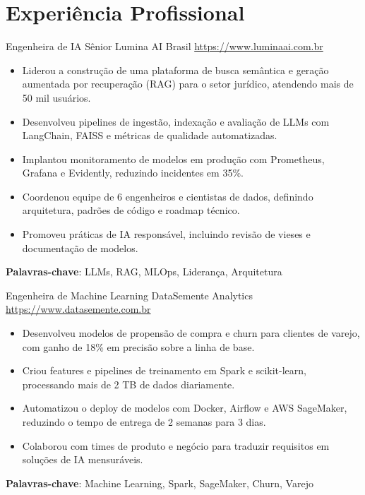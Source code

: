 \documentclass[a4paper, serif, 10pt]{moderncv}
\begin{document}
\section{Experiência Profissional}

        {Engenheira de IA Sênior}
        {Lumina AI Brasil}
        {\url{https://www.luminaai.com.br}}
        {}
        {\begin{itemize}
\item Liderou a construção de uma plataforma de busca semântica e geração aumentada por recuperação (RAG) para o setor jurídico, atendendo mais de 50 mil usuários.
\item Desenvolveu pipelines de ingestão, indexação e avaliação de LLMs com LangChain, FAISS e métricas de qualidade automatizadas.
\item Implantou monitoramento de modelos em produção com Prometheus, Grafana e Evidently, reduzindo incidentes em 35\%.
\item Coordenou equipe de 6 engenheiros e cientistas de dados, definindo arquitetura, padrões de código e roadmap técnico.
\item Promoveu práticas de IA responsável, incluindo revisão de vieses e documentação de modelos.
\end{itemize}
\textbf{Palavras-chave}: LLMs, RAG, MLOps, Liderança, Arquitetura}

        {Engenheira de Machine Learning}
        {DataSemente Analytics}
        {\url{https://www.datasemente.com.br}}
        {}
        {\begin{itemize}
\item Desenvolveu modelos de propensão de compra e churn para clientes de varejo, com ganho de 18\% em precisão sobre a linha de base.
\item Criou features e pipelines de treinamento em Spark e scikit-learn, processando mais de 2 TB de dados diariamente.
\item Automatizou o deploy de modelos com Docker, Airflow e AWS SageMaker, reduzindo o tempo de entrega de 2 semanas para 3 dias.
\item Colaborou com times de produto e negócio para traduzir requisitos em soluções de IA mensuráveis.
\end{itemize}
\textbf{Palavras-chave}: Machine Learning, Spark, SageMaker, Churn, Varejo}
\end{document}
